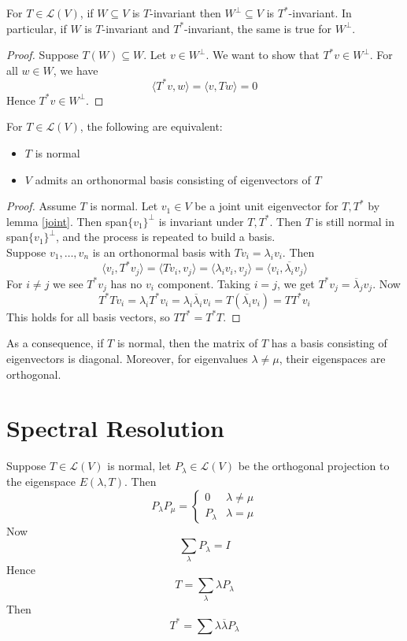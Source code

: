 \documentclass[12pt]{article}
\begin{document}
\begin{lem}
	For $T \in \mathcal L(V)$, if $W \subseteq V$ is $T$-invariant then $W^\perp \subseteq V$ is $T^*$-invariant. In particular, if $W$ is $T$-invariant and $T^*$-invariant, the same is true for $W^\perp$.
\end{lem}

\begin{proof}
	Suppose $T(W) \subseteq W$. Let $v \in W^\perp$. We want to show that $T^*v \in W^\perp$. For all $w \in W$, we have
	$$\langle T^*v,w \rangle = \langle v,Tw \rangle = 0$$
	Hence $T^*v \in W^\perp$.
\end{proof}

\begin{thm}
	For $T \in \mathcal L(V)$, the following are equivalent:
	\begin{itemize}
		\item $T$ is normal
		\item $V$ admits an orthonormal basis consisting of eigenvectors of $T$
	\end{itemize}
\end{thm}

\begin{proof}
	Assume $T$ is normal. Let $v_1 \in V$ be a joint unit eigenvector for $T,T^*$ by lemma \ref{joint}. Then span$\{v_1\}^\perp$ is invariant under $T,T^*$. Then $T$ is still normal in span$\{v_1\}^\perp$, and the process is repeated to build a basis. \\
	Suppose $v_1,\dots,v_n$ is an orthonormal basis with $Tv_i = \lambda_iv_i$. Then
	$$\langle v_i,T^*v_j \rangle = \langle Tv_i,v_j \rangle = \langle \lambda_iv_i,v_j \rangle = \langle v_i,\overline{\lambda_i}v_j \rangle$$
	For $i \neq j$ we see $T^*v_j$ has no $v_i$ component. Taking $i=j$, we get $T^*v_j = \overline{\lambda}_jv_j$. Now
	$$T^*Tv_i = \lambda_iT^*v_i = \lambda_i\overline{\lambda}_iv_i = T(\overline{\lambda_i}v_i) = TT^*v_i$$
	This holds for all basis vectors, so $TT^* = T^*T$.
\end{proof}

As a consequence, if $T$ is normal, then the matrix of $T$ has a basis consisting of eigenvectors is diagonal. Moreover, for eigenvalues $\lambda \neq \mu$, their eigenspaces are orthogonal.

\section{Spectral Resolution}

Suppose $T \in \mathcal L(V)$ is normal, let $P_\lambda \in \mathcal L(V)$ be the orthogonal projection to the eigenspace $E(\lambda,T)$. Then
$$P_\lambda P_\mu = \begin{cases} 0 & \lambda \neq \mu \\ P_\lambda & \lambda = \mu \end{cases}$$
Now
$$\sum_\lambda P_\lambda = I$$
Hence
$$T = \sum_\lambda \lambda P_\lambda$$
Then
$$T^* = \sum\lambda \overline{\lambda}P_\lambda$$
\end{document}
